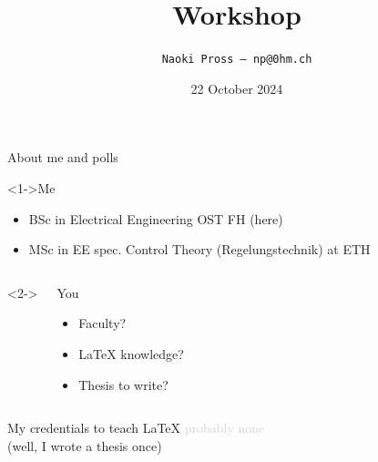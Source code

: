 \documentclass[xetex, onlymath]{beamer}
\title{\textrm{\LaTeXe} Workshop}
\author[NaoPross]{\texttt{Naoki Pross --- np@0hm.ch}}
\date{22 October 2024}
\institute[OST]{OST FHO Campus Rapperswil}
\begin{document}
\frame{
  \maketitle
}

\begin{frame}[fragile]{About me and polls}
  \begin{block}<1->{Me}
    \begin{itemize}
      \item BSc in Electrical Engineering OST FH (here)
      \item MSc in EE spec. Control Theory (Regelungstechnik) at ETH
    \end{itemize}
  \end{block}

  \begin{columns}[b]<2->
    \begin{column}{.3\linewidth}
      \begin{exampleblock}{You}
        \begin{itemize}
          \item Faculty?
          \item \textrm{\LaTeX} knowledge?
          \item Thesis to write?
        \end{itemize}
      \end{exampleblock}
    \end{column}
    \begin{column}{.65\linewidth}
    \end{column}
  \end{columns}
\end{frame}

\begin{frame}{My credentials to teach \textrm{\LaTeX}}
  \centering
  \textcolor{lightgray}{\footnotesize probably none} \\
  \textcolor{lightgray!50}{\footnotesize (well, I wrote a thesis once)}
\end{frame}
\end{document}
